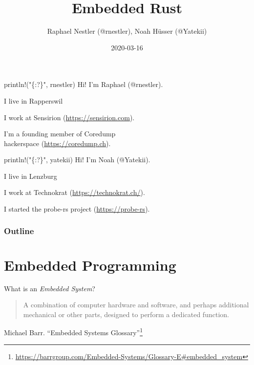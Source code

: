 \documentclass[aspectratio=1610,14pt,t]{beamer}
\title{Embedded Rust}
\date{2020-03-16}
\author{Raphael Nestler (@rnestler), Noah Hüsser (@Yatekii)}
\institute{Rust Zürichsee Meetup}
\begin{document}
\pagecolor{almostwhite}  %
\maketitle


\begin{frame}[c]{println!("\{:?\}", rnestler)}
  Hi! I'm Raphael (@rnestler).

  \pause I live in Rapperswil

  \pause I work at Sensirion ({\small \url{https://sensirion.com}}).

  \pause I'm a founding member of Coredump\\hackerspace ({\small \url{https://coredump.ch}}).
\end{frame}

\begin{frame}[c]{println!("\{:?\}", yatekii)}
  Hi! I'm Noah (@Yatekii).

  \pause I live in Lenzburg

  \pause I work at Technokrat ({\small \url{https://technokrat.ch/}}).

  \pause I started the probe-rs project ({\small \url{https://probe-rs}}).
\end{frame}


\begin{frame}
  \frametitle{Outline}
  \setcounter{tocdepth}{1}
  \tableofcontents
\end{frame}



\section{Embedded Programming}

\begin{frame}[c]{What is an \emph{Embedded System}?}
  \begin{quote}
    A combination of computer hardware and software, and perhaps
    additional mechanical or other parts, designed to perform a dedicated
    function.
  \end{quote}
  Michael Barr. ``Embedded Systems Glossary''\footnote{\tiny\url{https://barrgroup.com/Embedded-Systems/Glossary-E\#embedded\_system}}
\end{frame}
\end{document}
